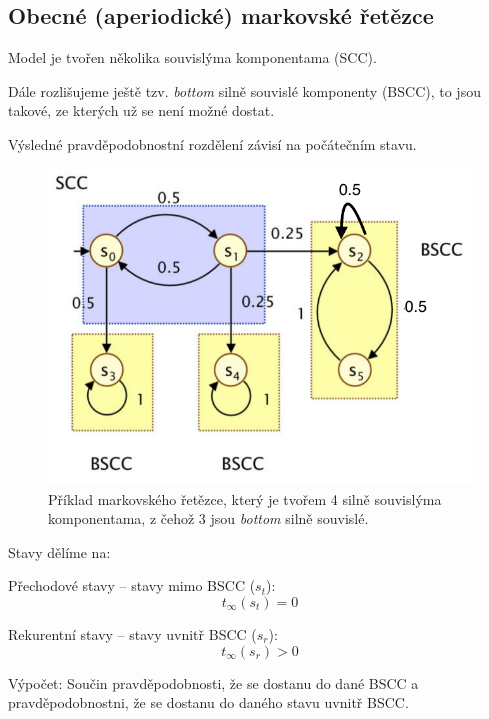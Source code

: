 \subsection{Obecné (aperiodické) markovské řetězce} \begin{compactitem}

    \item Model je tvořen několika souvislýma komponentama (SCC). \begin{compactitem}
        \item Dále rozlišujeme ještě tzv. \textit{bottom} silně souvislé komponenty (BSCC), to jsou takové, ze kterých už se není možné dostat.
    \end{compactitem}

    \item Výsledné pravděpodobnostní rozdělení závisí na počátečním stavu.
\end{compactitem}

\begin{figure}[H]
    \centering
    \includegraphics[width=0.6\linewidth]{ss-general.pdf}
    \caption{Příklad markovského řetězce, který je tvořem 4 silně souvislýma komponentama, z čehož 3 jsou \textit{bottom} silně souvislé.}
\end{figure}

\begin{compactitem}
    \item Stavy dělíme na: \begin{compactitem}
        \item Přechodové stavy -- stavy mimo BSCC ($s_t$):
        $$ t_{\infty} (s_t) = 0 $$
        \item Rekurentní stavy -- stavy uvnitř BSCC ($s_r$):
        $$ t_{\infty} (s_r) > 0 $$
    \end{compactitem}

    \item Výpočet: Součin pravděpodobnosti, že se dostanu do dané BSCC a pravděpodobnostni, že se dostanu do daného stavu uvnitř BSCC.

\end{compactitem}

